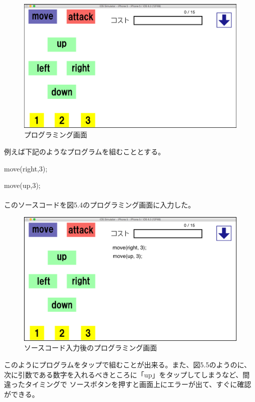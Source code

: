 \documentclass[openany,11pt,papersize]{jsbook}
\begin{document}
\begin{figure}[H]
\begin{center}
\includegraphics[width=12cm, bb=0 0 1136 662]{img/4thParagraph/Prog-ra_programming.png}
\end{center}
\caption{プログラミング画面}
\end{figure}

例えば下記のようなプログラムを組むこととする。
\par move(right,3);
\par move(up,3);
\\
\\
このソースコードを図5.4のプログラミング画面に入力した。

\begin{figure}[H]
\begin{center}
\includegraphics[width=12cm, bb=0 0 1136 662]{img/4thParagraph/Prog-ra_programming1.png}
\end{center}
\caption{ソースコード入力後のプログラミング画面}
\end{figure}

このようにプログラムをタップで組むことが出来る。また、図5.5のようのに、
次に引数である数字を入れるべきところに「up」をタップしてしまうなど、間違ったタイミングで
ソースボタンを押すと画面上にエラーが出て、すぐに確認ができる。
\end{document}
